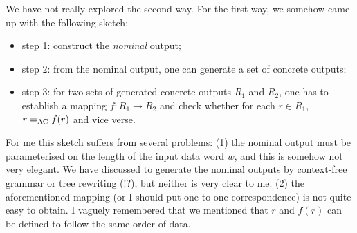 \documentclass[runningheads,a4paper]{llncs}
\begin{document}
We have not really explored the second way. For the first way, we somehow came up with the following sketch:
\begin{itemize}
\item step 1: construct the \emph{nominal} output;
\item step 2: from the nominal output, one can generate a set of concrete outputs;
\item step 3: for two sets of generated concrete outputs $R_1$ and $R_2$, one has to establish a  mapping $f: R_1\rightarrow R_2$ and check whether for each $r\in R_1$, $r=_{\rm AC} f(r)$ and vice verse. 
\end{itemize}

For me this sketch suffers from several problems: (1) the nominal output must be parameterised on the length of the input data word $w$, and this is somehow not very elegant. We have discussed to generate the nominal outputs by context-free grammar or tree rewriting (!?), but neither is very clear to me. (2) the aforementioned mapping (or I should put one-to-one correspondence) is not quite easy to obtain. I vaguely remembered that we mentioned that $r$ and $f(r)$ can be defined to follow the same order of data. 



\end{document}
